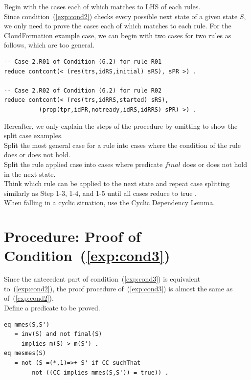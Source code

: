 \documentclass[12pt]{report}
\begin{document}
 Begin with the cases each of which matches to
LHS of each rules. \\ Since condition~(\ref{exp:cond2}) checks every
possible next state of a given state $S$, we only need to prove the
cases each of which matches to each rule. For the CloudFormation
example case, we can begin with two cases for two rules as follows,
which are too general.
\begin{verbatim}
-- Case 2.R01 of Condition (6.2) for rule R01
reduce contcont(< (res(trs,idRS,initial) sRS), sPR >) .

-- Case 2.R02 of Condition (6.2) for rule R02
reduce contcont(< (res(trs,idRRS,started) sRS), 
          (prop(tpr,idPR,notready,idRS,idRRS) sPR) >) .
\end{verbatim}

Hereafter, we only explain the steps of the procedure by omitting to show
the split case examples. \\

 Split the most general case for a rule into
cases where the condition of the rule does or does not hold. \\

 Split the rule applied case into cases
where predicate $final$ does or does not hold in the next state.\\

 Think which rule can be applied to the next
state and repeat case splitting similarly as Step 1-3, 1-4, and 1-5
until all cases reduce to true . \\

 When falling in a cyclic situation, use the
Cyclic Dependency Lemma.

\section{Procedure: Proof of Condition~(\ref{exp:cond3})}
\label{sec:mesmes}
Since the antecedent part of condition~(\ref{exp:cond3}) is equivalent
to~(\ref{exp:cond2}), the proof procedure of~(\ref{exp:cond3}) is
almost the same as of~(\ref{exp:cond2}). \\

 Define a predicate to be proved.
\begin{verbatim}
eq mmes(S,S')
   = inv(S) and not final(S)
     implies m(S) > m(S') .
eq mesmes(S)
   = not (S =(*,1)=>+ S' if CC suchThat
        not ((CC implies mmes(S,S')) = true)) .
\end{verbatim}
\end{document}

